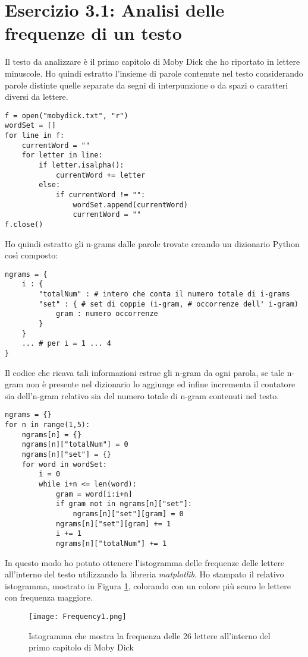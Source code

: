 \documentclass{article}
\begin{document}
\section*{Esercizio 3.1: Analisi delle frequenze di un testo}
Il testo da analizzare è il primo capitolo di Moby Dick che ho riportato in lettere minuscole. Ho quindi estratto l'insieme di parole contenute nel testo considerando parole distinte quelle separate da segni di interpunzione o da spazi o caratteri diversi da lettere.
\begin{lstlisting}
f = open("mobydick.txt", "r")
wordSet = []
for line in f:
    currentWord = ""
    for letter in line:
        if letter.isalpha():
            currentWord += letter
        else:
            if currentWord != "":
                wordSet.append(currentWord)
                currentWord = ""
f.close() 
\end{lstlisting}
Ho quindi estratto gli n-grams dalle parole trovate creando un dizionario Python così composto:
\begin{lstlisting}
ngrams = {
    i : {
        "totalNum" : # intero che conta il numero totale di i-grams
        "set" : { # set di coppie (i-gram, # occorrenze dell' i-gram)
            gram : numero occorrenze 
        }
    }
    ... # per i = 1 ... 4
}
\end{lstlisting}
Il codice che ricava tali informazioni estrae gli n-gram da ogni parola, se tale n-gram non è presente nel dizionario lo aggiunge ed infine incrementa il contatore sia dell'n-gram relativo sia del numero totale di n-gram contenuti nel testo.
\begin{lstlisting}
ngrams = {}
for n in range(1,5):
    ngrams[n] = {}
    ngrams[n]["totalNum"] = 0
    ngrams[n]["set"] = {}
    for word in wordSet:
        i = 0
        while i+n <= len(word):
            gram = word[i:i+n]
            if gram not in ngrams[n]["set"]:
                ngrams[n]["set"][gram] = 0
            ngrams[n]["set"][gram] += 1
            i += 1
            ngrams[n]["totalNum"] += 1
\end{lstlisting}
In questo modo ho potuto ottenere l'istogramma delle frequenze delle lettere all'interno del testo utilizzando la libreria \textit{matplotlib}. Ho stampato il relativo istogramma, mostrato in Figura \ref{fig:figura}, colorando con un colore più scuro le lettere con frequenza maggiore.
\begin{figure}[h!]
\centering
\texttt{[image: Frequency1.png]}
\caption{Istogramma che mostra la frequenza delle 26 lettere all'interno del primo capitolo di Moby Dick}
\label{fig:figura}
\end{figure}
\end{document}
